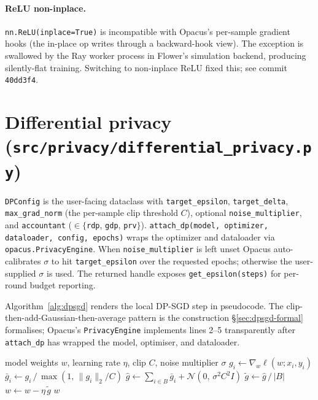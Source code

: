 \documentclass[11pt,a4paper]{report}
\begin{document}
\paragraph{ReLU non-inplace.}
\texttt{nn.ReLU(inplace=True)} is incompatible with Opacus's per-sample
gradient hooks (the in-place op writes through a backward-hook view).
The exception is swallowed by the Ray worker process in Flower's
simulation backend, producing silently-flat training. Switching to
non-inplace ReLU fixed this; see commit \texttt{40dd3f4}.

\section{Differential privacy (\texttt{src/privacy/differential\_privacy.py})}

\texttt{DPConfig} is the user-facing dataclass with
\texttt{target\_epsilon}, \texttt{target\_delta}, \texttt{max\_grad\_norm}
(the per-sample clip threshold $C$), optional \texttt{noise\_multiplier}, and
\texttt{accountant} ($\in\{$\texttt{rdp}, \texttt{gdp}, \texttt{prv}$\}$).
\texttt{attach\_dp(model, optimizer, dataloader, config, epochs)} wraps the
optimizer and dataloader via \texttt{opacus.PrivacyEngine}. When
\texttt{noise\_multiplier} is left unset Opacus auto-calibrates $\sigma$ to
hit \texttt{target\_epsilon} over the requested epochs; otherwise the
user-supplied $\sigma$ is used. The returned handle exposes
\texttt{get\_epsilon(steps)} for per-round budget reporting.

Algorithm~\ref{alg:dpsgd} renders the local DP-SGD step in pseudocode. The
clip-then-add-Gaussian-then-average pattern is the construction
\S\ref{sec:dpsgd-formal} formalises; Opacus's \texttt{PrivacyEngine}
implements lines 2--5 transparently after \texttt{attach\_dp} has wrapped
the model, optimiser, and dataloader.

\begin{algorithm}[h]
\caption{Local DP-SGD step on minibatch $B$}\label{alg:dpsgd}
\begin{algorithmic}[1]
\Require model weights $w$, learning rate $\eta$, clip $C$, noise multiplier $\sigma$
\State $g_i \gets \nabla_w \ell(w; x_i, y_i)$ 
\State $\bar g_i \gets g_i \,/\, \max(1,\, \|g_i\|_2 / C)$ 
\State $\hat g \gets \sum_{i \in B} \bar g_i + \mathcal{N}(0,\, \sigma^2 C^2 I)$ 
\State $\tilde g \gets \hat g \,/\, |B|$ 
\State $w \gets w - \eta\, \tilde g$ 
\State \Return $w$
\end{algorithmic}
\end{algorithm}
\end{document}
